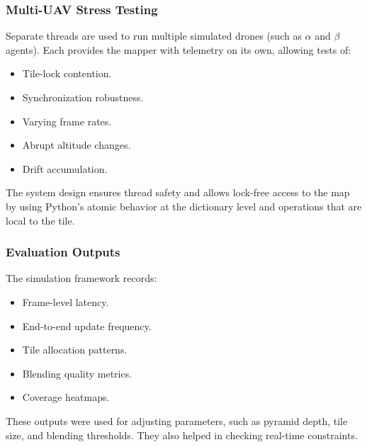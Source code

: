 \documentclass[conference]{IEEEtran}
\begin{document}
\subsubsection{Multi-UAV Stress Testing}
Separate threads are used to run multiple simulated drones (such as $\alpha$ and $\beta$ agents). Each provides the mapper with telemetry on its own, allowing tests of:
\begin{itemize}
    \item Tile-lock contention.
    \item Synchronization robustness.
    \item Varying frame rates.
    \item Abrupt altitude changes.
    \item Drift accumulation.
\end{itemize}
The system design ensures thread safety and allows lock-free access to the map by using Python’s atomic behavior at the dictionary level and operations that are local to the tile.  
\subsubsection{Evaluation Outputs}
The simulation framework records:
\begin{itemize}
    \item Frame-level latency.
    \item End-to-end update frequency.
    \item Tile allocation patterns.
    \item Blending quality metrics.
    \item Coverage heatmaps.
\end{itemize}
These outputs were used for adjusting parameters, such as pyramid depth, tile size, and blending thresholds. They also helped in checking real-time constraints.

\end{document}

